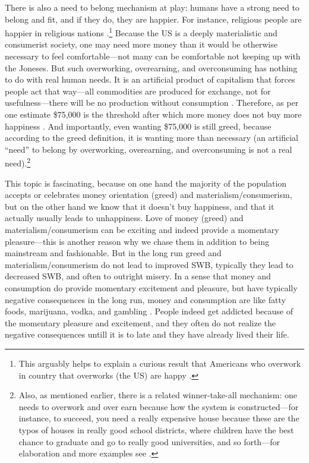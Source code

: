 \documentclass[10pt, letterpaper]{article}
\begin{document}
\begin{spacing}{1.8}
There is also a need to belong mechanism at play: humans have a strong need to
belong and fit, and if they do, they are happier. For instance, religious people are happier in religious nations
\citep{aokrel}.\footnote{This arguably helps to explain a curious result that
  Americans who overwork in country that overworks (the US) are happy \citep{aokditella}.}
Because the US is a deeply materialistic and consumerist society, one may need more money than it would be otherwise necessary to feel comfortable---not
many can be comfortable not keeping up with the Joneses. But such overworking, overearning, and overconsuming has nothing to do with real human needs. It is an artificial
product of capitalism that forces people act that way---all commodities are
produced for exchange, not for usefulness---there will be no production without
consumption \citep{marx1844-human-requirements}. Therefore, as per one estimate
\$75,000 is the threshold after which more money does not buy more happiness
\citep{kahneman10}. And importantly, even wanting \$75,000 is still greed,
because according to the greed definition, it is wanting more than necessary (an
artificial ``need'' to belong by overworking, overearning, and overconsuming is not a real need).\footnote{Also, as mentioned earlier, there is a related winner-take-all
  mechanism: one needs to overwork and over earn because how the system is constructed---for instance, to succeed, you need a really expensive house
  because these are the typos of houses in really good school districts, where children have the best chance to graduate and go to really good universities, and
  so forth---for elaboration and more examples see \citet{frank12}.}

This topic is fascinating, because on one hand the majority of the population
accepts or celebrates money orientation (greed) and materialism/consumerism, but on the other hand
we know that it doesn't buy happiness, and that it actually usually leads to
unhappiness. Love of money (greed) and materialism/consumerism can be
exciting and indeed provide a momentary pleasure---this is another reason why we
chase them in addition to being mainstream and fashionable. 
But in the long run greed and materialism/consumerism do not lead to improved SWB, typically they lead to decreased SWB, and often to outright misery. In a
sense that money and consumption do provide momentary excitement and pleasure,
but have typically negative consequences in the long run, money and consumption
are like fatty foods, marijuana, vodka, and gambling \citep{linden11}. People
indeed get addicted because of the momentary pleasure and excitement, and they
often do not realize the negative consequences untill it is to late and they
have already lived their life. 
%
%
%


\end{spacing}
\end{document}
